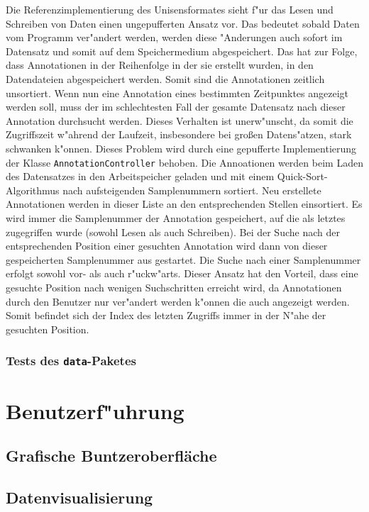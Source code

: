 Die Referenzimplementierung des Unisensformates sieht f"ur das Lesen und Schreiben von Daten einen ungepufferten Ansatz vor.
Das bedeutet sobald Daten vom Programm ver"andert werden, werden diese "Anderungen auch sofort im Datensatz und somit auf dem Speichermedium abgespeichert.
Das hat zur Folge, dass Annotationen in der Reihenfolge in der sie erstellt wurden, in den Datendateien abgespeichert werden.
Somit sind die Annotationen zeitlich unsortiert.
Wenn nun eine Annotation eines bestimmten Zeitpunktes angezeigt werden soll, muss der im schlechtesten Fall der gesamte Datensatz nach dieser Annotation durchsucht werden.
Dieses Verhalten ist unerw"unscht, da somit die Zugriffszeit w"ahrend der Laufzeit, insbesondere bei gro\ss en Datens"atzen, stark schwanken k"onnen.
Dieses Problem wird durch eine gepufferte Implementierung der Klasse \verb|AnnotationController| behoben.
Die Annoationen werden beim Laden des Datensatzes in den Arbeitspeicher geladen und mit einem Quick-Sort-Algorithmus nach aufsteigenden Samplenummern sortiert.
Neu erstellete Annotationen werden in dieser Liste an den entsprechenden Stellen einsortiert.
Es wird immer die Samplenummer der Annotation gespeichert, auf die als letztes zugegriffen wurde (sowohl Lesen als auch Schreiben).
Bei der Suche nach der entsprechenden Position einer gesuchten Annotation wird dann von dieser gespeicherten Samplenummer aus gestartet.
Die Suche nach einer Samplenummer erfolgt sowohl vor- als auch r"uckw"arts.
Dieser Ansatz hat den Vorteil, dass eine gesuchte Position nach wenigen Suchschritten erreicht wird, da Annotationen durch den Benutzer nur ver"andert werden k"onnen die auch angezeigt werden.
Somit befindet sich der Index des letzten Zugriffs immer in der N"ahe der gesuchten Position.

\subsubsection{Tests des \texttt{data}-Paketes}




\section{Benutzerf"uhrung}



\subsection{Grafische Buntzeroberfl\"ache}

\subsection{Datenvisualisierung}

